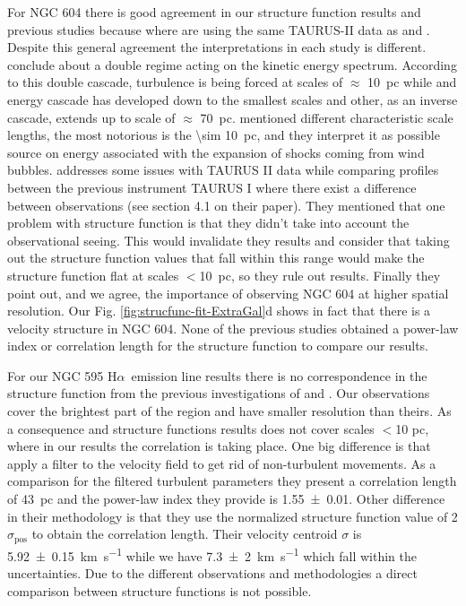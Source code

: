 \documentclass[fleqn,usenatbib, useAMS, a4paper]{mnras}
\newcommand\pos{\ensuremath{_{\mathrm{pos}}}}
\newcommand\halpha{H${\alpha}$}
\begin{document}
For NGC 604 there is good agreement in our structure function results and previous studies because where are using the same TAURUS-II data as \citet{Melnick:2021x} and \citet{Medina-Tanco:1997a}.
Despite this general agreement the interpretations in each study is different.
\citet{Medina-Tanco:1997a} conclude about a double regime acting on the kinetic energy spectrum.
According to this double cascade, turbulence is being forced at scales of \(\approx\) \SI{10}{pc} while and energy cascade has developed down to the smallest scales and other, as an inverse cascade, extends up to scale of \(\approx\) \SI{70}{pc}.
\citet{Medina-Tanco:1997a} mentioned different characteristic scale lengths, the most notorious is the \SI{\sim 10}{pc}, and they interpret it as possible source on energy associated with the expansion of shocks coming from wind bubbles.  
\citet{Melnick:2021x} addresses some issues with TAURUS II data while comparing profiles between the previous instrument TAURUS I where there exist a difference between observations (see section 4.1 on their paper).
They mentioned that one problem with \citet{Medina-Tanco:1997a} structure function is that they didn't take into account the observational seeing.
This would invalidate they results and \citet{Melnick:2021x} consider that taking out the structure function values that fall within this range would make the structure function flat at scales \(<\)\SI{10}{pc}, so they rule out \citet{Medina-Tanco:1997a} results.
Finally they point out, and we agree, the importance of observing NGC 604 at higher spatial resolution. 
Our Fig. \ref{fig:strucfunc-fit-ExtraGal}d shows in fact that there is a velocity structure in NGC 604. 
None of the previous studies obtained a power-law index or correlation length for the structure function to compare our results.

For our NGC 595 \halpha\ emission line results there is no correspondence in the structure function from the previous investigations of \citet{lagrois2009multi} and \citet{lagrois2011}.
Our observations cover the brightest part of the region and have smaller resolution than theirs.
As a consequence \citet{lagrois2009multi} and \citet{lagrois2011} structure functions results does not cover scales $<$10 pc, where in our results the correlation is taking place.
One big difference is that \citet{lagrois2011} apply a  filter to the velocity field to get rid of non-turbulent movements.
As a comparison for the filtered turbulent parameters they present a correlation length of \SI{43}{pc} and the power-law index they provide is \num{1.55 \pm 0.01}.
Other difference in their methodology is that they use the normalized structure function value of 2\(\sigma\pos\) to obtain the correlation length.
Their velocity centroid \(\sigma\) is \SI{5.92 \pm 0.15}{km.s^{-1}} while we have \SI{7.3\pm 2}{km. s^{-1}} which fall within the uncertainties.
Due to the different observations and methodologies a direct comparison between structure functions is not possible.
\end{document}
